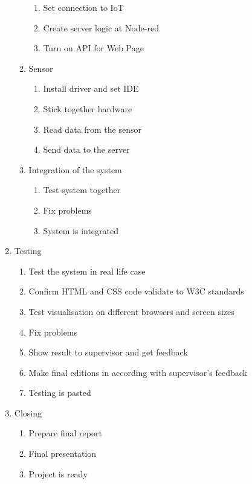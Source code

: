 \documentclass[english]{article}
\begin{document}
\begin{enumerate}
\begin{enumerate}[label*=\arabic*]
\begin{enumerate}[label*=\arabic*]
		\item Set connection to IoT
		\item Create server logic at Node-red
		\item Turn on API for Web Page
		\end{enumerate}
	\item Sensor
		\begin{enumerate}[label*=\arabic*]
		\item Install driver and set IDE
		\item Stick together hardware
		\item Read data from the sensor
		\item Send data to the server
		\end{enumerate}
	\item Integration of the system
		\begin{enumerate}[label*=\arabic*]
		\item Test system together
		\item Fix problems
		\item System is integrated
		\end{enumerate}
	\end{enumerate}
\item Testing
	\begin{enumerate}[label*=\arabic*]
	\item Test the system in real life case
	\item Confirm HTML and CSS code validate to W3C standards
	\item Test visualisation on different browsers and screen sizes
	\item Fix problems
	\item Show result to supervisor and get feedback
	\item Make final editions in according with supervisor's feedback
	\item Testing is pasted
	\end{enumerate}
\item Closing 
	\begin{enumerate}[label*=\arabic*]
	\item Prepare final report
	\item Final presentation
	\item Project is ready
	\end{enumerate}
\end{enumerate}
\end{document}

